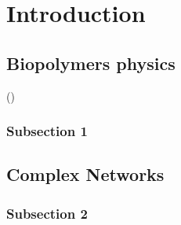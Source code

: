 
\chapter{Introduction} %

\label{Introduction} %






\section{Biopolymers physics}


 (\citet{storm_nonlinear_2005})
\citet{stein_algorithm_2008}



\subsection{Subsection 1}






\section{Complex Networks}

\subsection{Subsection 2}